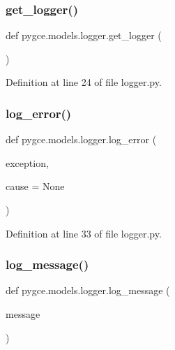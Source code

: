 \subsubsection{\texorpdfstring{get\+\_\+logger()}{get\_logger()}}
{\footnotesize\ttfamily def pygce.\+models.\+logger.\+get\+\_\+logger (\begin{DoxyParamCaption}{ }\end{DoxyParamCaption})}



Definition at line 24 of file logger.\+py.

\mbox{\label{namespacepygce_1_1models_1_1logger_ad235bade65af8d370a613aa941dc6958}} 
\subsubsection{\texorpdfstring{log\+\_\+error()}{log\_error()}}
{\footnotesize\ttfamily def pygce.\+models.\+logger.\+log\+\_\+error (\begin{DoxyParamCaption}\item[{}]{exception,  }\item[{}]{cause = {\ttfamily None} }\end{DoxyParamCaption})}



Definition at line 33 of file logger.\+py.

\mbox{\label{namespacepygce_1_1models_1_1logger_a28a7a7a6cd33a45d28e7f3ea2cdd3fc8}} 
\subsubsection{\texorpdfstring{log\+\_\+message()}{log\_message()}}
{\footnotesize\ttfamily def pygce.\+models.\+logger.\+log\+\_\+message (\begin{DoxyParamCaption}\item[{}]{message }\end{DoxyParamCaption})}



